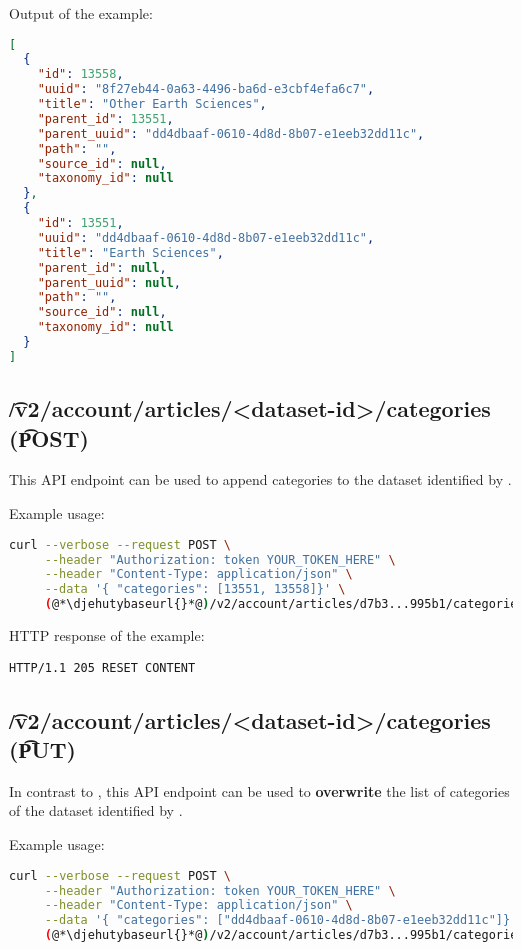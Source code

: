   Output of the example:
\begin{lstlisting}[language=JSON]
[
  {
    "id": 13558,
    "uuid": "8f27eb44-0a63-4496-ba6d-e3cbf4efa6c7",
    "title": "Other Earth Sciences",
    "parent_id": 13551,
    "parent_uuid": "dd4dbaaf-0610-4d8d-8b07-e1eeb32dd11c",
    "path": "",
    "source_id": null,
    "taxonomy_id": null
  },
  {
    "id": 13551,
    "uuid": "dd4dbaaf-0610-4d8d-8b07-e1eeb32dd11c",
    "title": "Earth Sciences",
    "parent_id": null,
    "parent_uuid": null,
    "path": "",
    "source_id": null,
    "taxonomy_id": null
  }
]
\end{lstlisting}

\subsection{\t{/v2/account/articles/<dataset-id>/categories} (\t{POST})}
\label{sec:api-v2-articles-categories-post}

  This API endpoint can be used to append categories to the dataset identified
  by .  \categoriesParameters

  Example usage:
\begin{lstlisting}[language=bash]
curl --verbose --request POST \
     --header "Authorization: token YOUR_TOKEN_HERE" \
     --header "Content-Type: application/json" \
     --data '{ "categories": [13551, 13558]}' \
     (@*\djehutybaseurl{}*@)/v2/account/articles/d7b3...995b1/categories
\end{lstlisting}

  HTTP response of the example:
\begin{lstlisting}
HTTP/1.1 205 RESET CONTENT
\end{lstlisting}

\subsection{\t{/v2/account/articles/<dataset-id>/categories} (\t{PUT})}

  In contrast to , this API endpoint
  can be used to \textbf{overwrite} the list of categories of the dataset identified
  by \code{dataset-id}.

  Example usage:
\begin{lstlisting}[language=bash]
curl --verbose --request POST \
     --header "Authorization: token YOUR_TOKEN_HERE" \
     --header "Content-Type: application/json" \
     --data '{ "categories": ["dd4dbaaf-0610-4d8d-8b07-e1eeb32dd11c"]}' \
     (@*\djehutybaseurl{}*@)/v2/account/articles/d7b3...995b1/categories
\end{lstlisting}

